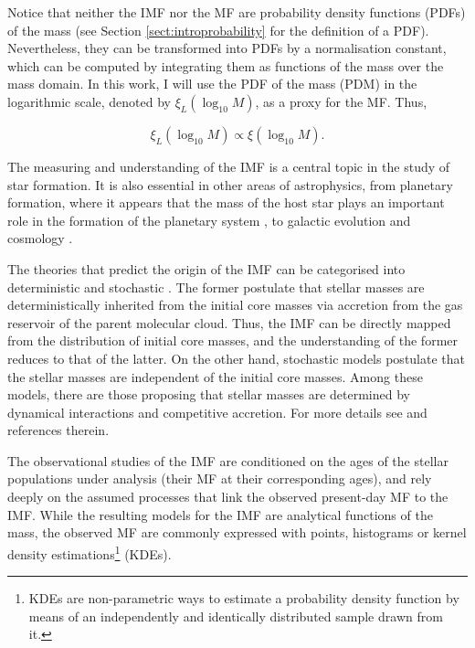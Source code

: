 Notice that neither the IMF nor the MF are probability density functions (PDFs) of the mass (see Section \ref{sect:introprobability} for the definition of a PDF). Nevertheless, they can be transformed into PDFs by a normalisation constant, which can be computed by integrating them as functions of the mass over the mass domain. In this work, I will use the PDF of the mass (PDM) in the logarithmic scale, denoted by $\xi_L (\log_{10}M)$, as a proxy for the MF. Thus,

\begin{equation}
\xi_L (\log_{10} M) \propto \xi (\log_{10} M).\nonumber
\end{equation}

The measuring and understanding of the IMF is a central topic in the study of star formation. It is also essential in other areas of astrophysics, from planetary formation, where it appears that the mass of the host star plays an important role in the formation of the planetary system \cite[see for example][]{2015ApJ...814..130M}, to galactic evolution \citep{1998ASPC..142....1K} and cosmology \cite[see for example][]{2012MNRAS.423.3601N}. 

The theories that predict the origin of the IMF can be categorised into deterministic and stochastic \citep{Offner2014}. The former postulate that stellar masses are deterministically inherited from the initial core masses via accretion from the gas reservoir of the parent molecular cloud. Thus, the IMF can be directly mapped from the distribution of initial core masses, and the understanding of the former reduces to that of the latter. On the other hand, stochastic models postulate that the stellar masses are independent of the initial core masses. Among these models, there are those proposing that stellar masses are determined by dynamical interactions and competitive accretion. For more details see \citet{Offner2014} and references therein. 

  The observational studies of the IMF are conditioned on the ages of the stellar populations under analysis (their MF at their corresponding ages), and rely deeply on the assumed processes that link the observed present-day MF to the IMF. While the resulting models for the IMF are analytical functions of the mass, the observed MF are commonly expressed with points, histograms or kernel density estimations\footnote{KDEs are non-parametric ways to estimate a probability density function by means of an independently and identically distributed sample drawn from it.} (KDEs).

